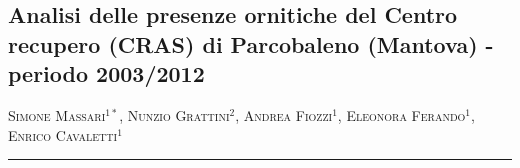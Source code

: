 \setcounter{figure}{0}
\setcounter{table}{0}

\begin{adjustwidth}{-3.5cm}{0cm}
\pagestyle{CIOpage}
\chapter*[Analisi delle presenze presso il CRAS Parcobaleno]{\bfseries
Analisi delle presenze ornitiche del Centro recupero (CRAS) di
Parcobaleno (Mantova) - periodo 2003/2012}

\textsc{Simone Massari}$^{1*}$, \textsc{Nunzio Grattini}$^{2}$,
\textsc{Andrea Fiozzi}$^{1}$, \textsc{Eleonora Ferando}$^{1}$,
\textsc{Enrico Cavaletti}$^{1}$\\

    
\noindent\color{MUSEBLUE}\rule{27cm}{2pt}
\vspace{1cm}
\end{adjustwidth}




